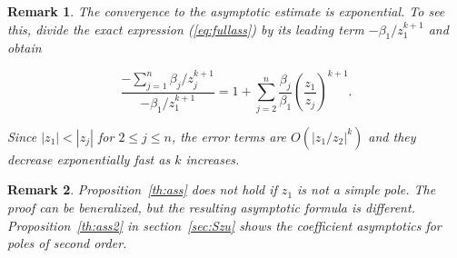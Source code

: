 \documentclass{article}
\newtheorem{remark}{Remark}
\begin{document}
\begin{remark}
The convergence to the asymptotic estimate is exponential. To see this,
divide the exact expression (\ref{eq:fullass}) by its leading term
$-\beta_1/z_1^{k+1}$ and obtain

\begin{equation*}
\frac{-\sum_{j=1}^n \beta_j/z_j^{k+1}}{-\beta_1/z_1^{k+1}} =
1 + \sum_{j=2}^n
\frac{\beta_j}{\beta_1} \left( \frac{z_1}{z_j} \right)^{k+1}.
\end{equation*}

Since $|z_1| < |z_j|$ for $2 \leq j \leq n$, the error terms are
$O(|z_1/z_2|^k)$ and they decrease exponentially fast as $k$ increases.
\end{remark}

\begin{remark}
Proposition~\ref{th:ass} does not hold if $z_1$ is not a simple pole.
The proof can be beneralized, but the resulting asymptotic formula is
different. Proposition~\ref{th:ass2} in section~\ref{sec:Szu} shows the
coefficient asymptotics for poles of second order.
\end{remark}
\end{document}

